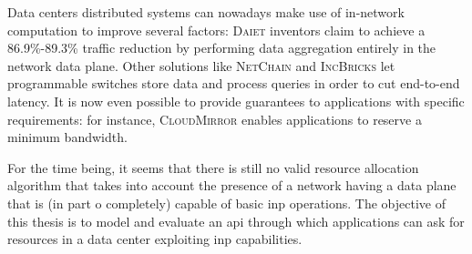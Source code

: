 Data centers distributed systems can nowadays make use of in-network computation to improve several factors: \textsc{Daiet} \cite{daiet} inventors claim to achieve a 86.9\%-89.3\% traffic reduction by performing data aggregation entirely in the network data plane.
Other solutions like \textsc{NetChain} \cite{netchain} and \textsc{IncBricks} \cite{incbricks} let programmable switches store data and process queries in order to cut end-to-end latency.
It is now even possible to provide guarantees to applications with specific requirements: for instance, \textsc{CloudMirror} \cite{cloudmirror} enables applications to reserve a minimum bandwidth.\par
For the time being, it seems that there is still no valid resource allocation algorithm that takes into account the presence of a network having a data plane that is (in part o completely) capable of basic \gls{inp} operations.
The objective of this thesis is to model and evaluate an \gls{api} through which applications can ask for resources in a data center exploiting \gls{inp} capabilities. %